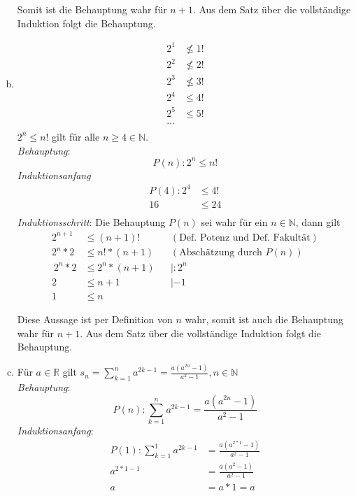 \documentclass{article}
\begin{document}
\begin{enumerate}[a)]
  Somit ist die Behauptung wahr für $n + 1$.
  Aus dem Satz über die vollständige Induktion folgt die Behauptung.
  
\item
  \begin{align*}
    2^1 &\nleq 1! \\
    2^2 &\nleq 2! \\
    2^3 &\nleq 3! \\
    2^4 &\leq 4! \\
    2^5 &\leq 5! \\
    \ldots \\
  \end{align*}
  $2^n \leq n!$ gilt für alle $n \geq 4 \in \mathbb{N}$. \\
  \emph{Behauptung}:
  \[
    P(n) \colon 2^n \leq n! 
  \]
  \emph{Induktionsanfang}
  \begin{align*}
    P(4) \colon 2^4 &\leq 4! \\
                 16 &\leq 24 \\
  \end{align*}
  \emph{Induktionsschritt}: Die Behauptung $P(n)$ sei wahr für ein $n \in \mathbb{N}$,
  dann gilt \\

  \begin{align*}
    2^{n + 1} &\leq (n + 1)!     && (\text{Def. Potenz und Def. Fakultät}) \\
    2^n * 2  &\leq n! * (n + 1)  && (\text{Abschätzung durch $P(n)$}) \\\
    2^n * 2  &\leq 2^n * (n + 1) && | : 2^n \\
    2        &\leq n + 1         && | - 1 \\
    1        &\leq n
  \end{align*}
  
  Diese Aussage ist per Definition von $n$ wahr, somit ist auch die Behauptung wahr für $n + 1$.
  Aus dem Satz über die vollständige Induktion folgt die Behauptung.

\newpage
\item Für $a \in \mathbb{R}$ gilt $s_n = \sum\limits_{k = 1}^n a^{2k - 1} = \frac{a(a^{2n} - 1)}{a^2 - 1}, n \in \mathbb{N}$ \\
  \emph{Behauptung}:
  \[
    P(n) \colon \sum\limits_{k = 1}^n a^{2k - 1} = \frac{a(a^{2n} - 1)}{a^2 - 1} 
  \]
  \emph{Induktionsanfang}:
  \begin{align*}
    P(1) \colon \sum\limits_{k = 1}^1 a^{2k - 1} &= \frac{a(a^{2 * 1} - 1)}{a^2 - 1}  \\
                                   a^{2 * 1 - 1} &= \frac{a(a^2 - 1)}{a^2 - 1}  \\
                                               a &= a * 1 = a \\
  \end{align*}


\end{enumerate}
\end{document}
